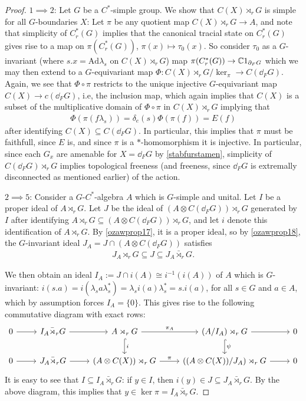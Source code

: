 \begin{proof}
	$1 \implies 2$: Let $G$ be a $C^*$-simple group. We show that $C(X) \rtimes_r G$ is simple for all $G$-boundaries $X$: Let $\pi$ be any quotient map $C(X) \rtimes_r G \to A$, and note that simplicity of $C_r^*(G)$ implies that the canonical tracial state on $C_r^*(G)$ gives rise to a map on $\pi(C_r^*(G))$, $\pi(x) \mapsto \tau_0(x)$. So consider $\tau_0$ as a $G$-invariant (where $s.x = \mathrm{Ad} \lambda_s$ on $C(X) \rtimes_r G$) map $ \pi(C_r^*(G)) \to \mathbb{C} 1_{\partial_F G}$ which we may then extend to a $G$-equivariant map $\Phi \colon C(X) \rtimes_r G/\ker_\pi \to C(\dd_F G)$. Again, we see that $\Phi \circ \pi$ restricts to the unique injective $G$-equivariant map $C(X) \to c(\dd_F G)$, i.e, the inclusion map, which again implies that $C(X)$ is a subset of the multiplicative domain of $\Phi \circ \pi$ in $C(X) \rtimes_r G$ implying that
	\begin{align*}
		\Phi (\pi(f \lambda_s)) = \delta_{e}(s) \Phi(\pi(f)) = E(f)	
	\end{align*}
	after identifying $C(X) \subseteq C(\dd_F G)$. In particular, this implies that $\pi$ must be faithfull, since $E$ is, and since $\pi$ is a $*$-homomorphism it is injective. In particular, since each $G_x$ are amenable for $X= \dd_F G$ by \cref{stabfurstamen}, simplicity of $C( \dd_F G) \rtimes_r G$ implies topological freeness (and freeness, since $\dd_F G$ is extremally disconnected as mentioned earlier) of the action.

	$2 \implies 5$: Consider a $G$-$C^*$-algebra $A$ which is $G$-simple and unital. Let $I$ be a proper ideal of $A \rtimes_r G$. Let $J$ be the ideal of $(A \otimes C(\dd_F G)) \rtimes_r G$ generated by $I$ after identifying $A \rtimes_r G \subseteq (A \otimes C(\dd_F G) ) \rtimes_r G$, and let $i$ denote this identification of $A \rtimes_r G$. By \cref{ozawprop17}, it is a proper ideal, so by \cref{ozawprop18}, the $G$-invariant ideal $J_A = J \cap (A \otimes C(\dd_F G))$ satisfies
	\begin{align*}
		J_A \rtimes_r G \subseteq J \subseteq J_A \bar \rtimes_r G.
	\end{align*}

	We then obtain an ideal $I_A := J \cap i(A) \cong i^{-1}(i(A))$ of $A$ which is $G$-invariant: $i(s.a) = i(\lambda_s a \lambda_s^* ) = \lambda_s i(a) \lambda_s^* = s.i(a)$, for all $s \in G$ and $a \in A$, which by assumption forces $I_A = \{0\}$. This gives rise to the following commutative diagram with exact rows:
	\begin{equation*}
		\begin{tikzcd}
			0 \ar[r] &  I_A \bar \rtimes_r G  \ar[r] & A \rtimes_r G \ar[r, "\pi_A"] \ar[d, hook, "i"] & (A / I_A)\rtimes_r G  \ar[r] \ar[d, hook, "\psi"]  & 0\\
			0  \ar[r] & J_A \bar \rtimes_r G  \ar[r] & (A \otimes C(X)) \rtimes_r G \ar[r, "\pi"] & \left((A \otimes C(X))/J_A\right) \rtimes_r G \ar[r] & 0
		\end{tikzcd}
	\end{equation*}
	It is easy to see that $I \subseteq I_A \bar \rtimes_r G$: if $y \in I$, then $i(y) \in J \subseteq J_A \bar \rtimes_r G$. By the above diagram, this implies that $y \in \ker \pi = I_A \bar \rtimes_r G$. 
	

\end{proof}
